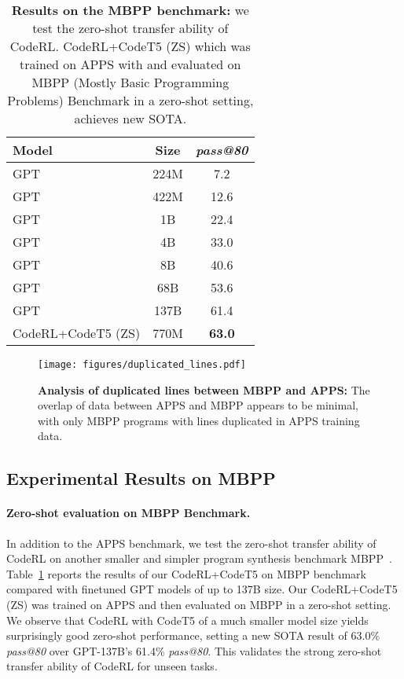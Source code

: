 \documentclass{article}
\begin{document}
\begin{table}[t] \centering
\caption{
\textbf{Results on the MBPP benchmark:}
we test the zero-shot transfer ability of CodeRL. 
CodeRL+CodeT5 (ZS) which was trained on APPS with  and evaluated on MBPP (Mostly Basic Programming Problems) Benchmark \citep{austin2021program} in a zero-shot setting, achieves new SOTA. 
}
\label{tab:codet5_mpbb}
\begin{tabular}{lc|c}
\hline
Model & Size & \emph{pass@80} \\
\hline
GPT & 224M & 7.2 \\
GPT & 422M & 12.6 \\
GPT & 1B & 22.4 \\
GPT & 4B & 33.0 \\
GPT & 8B & 40.6 \\
GPT & 68B & 53.6 \\
GPT & 137B & 61.4 \\
\hline
CodeRL+CodeT5 (ZS) & 770M & \textbf{63.0} \\
\hline
\end{tabular}
\end{table} 
\begin{figure}[t]
	\centering
	\resizebox{1.0\textwidth}{!} {
	\texttt{[image: figures/duplicated\_lines.pdf]}
	}
	\caption{
	\textbf{Analysis of duplicated lines between MBPP and APPS:}
	The overlap of data between APPS and MBPP appears to be minimal, with only  MBPP programs with  lines duplicated in APPS training data. 
}
	\label{fig:duplicated_lines}
\end{figure}

\subsection{Experimental Results on MBPP}
\label{subsec:mbpp}

\paragraph{Zero-shot evaluation on MBPP Benchmark.}
In addition to the APPS benchmark, we test the zero-shot transfer ability of CodeRL on another smaller and simpler program synthesis benchmark MBPP~\citep{austin2021program}. Table~\ref{tab:codet5_mpbb} reports the results of our CodeRL+CodeT5 on MBPP benchmark compared with finetuned GPT models of up to 137B size. Our CodeRL+CodeT5 (ZS) was trained on APPS and then evaluated on MBPP in a zero-shot setting. We observe that CodeRL with CodeT5 of a much smaller model size yields surprisingly good zero-shot performance, setting a new SOTA result of 63.0\% \emph{pass@80} over GPT-137B's 61.4\% \emph{pass@80}. This validates the strong zero-shot transfer ability of CodeRL for unseen tasks. 
\end{document}
